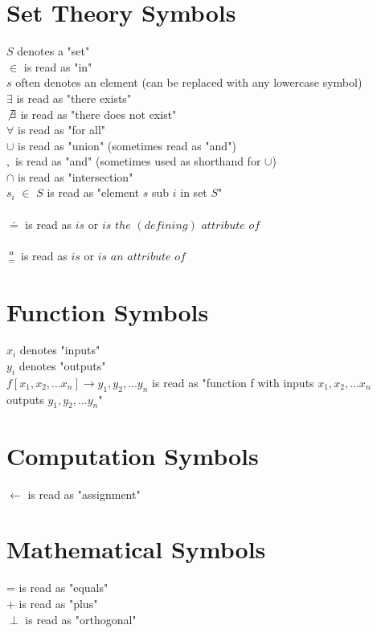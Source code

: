 \documentclass[11pt]{article}
\begin{document}
\section*{Set Theory Symbols}
$S$ denotes a "set"\\
$\in$ is read as "in"\\
$s$ often denotes an element (can be replaced with any lowercase symbol)\\
$\exists$ is read as "there exists"\\
$\not \exists$ is read as "there does not exist"\\
$\forall$ is read as "for all"\\
$\cup$ is read as "union" (sometimes read as "and")\\
$,$ \hspace{.5mm} is read as "and" (sometimes used as shorthand for $\cup$)\\
$\cap$ is read as "intersection"\\
$s_i$ $\in$ $S$ is read as "element $s$ sub $i$ in set $S$"\\ \\
$\doteq$ is read as $is$ or $is$ $the$ $(defining)$ $attribute$ $of$\\ \\
$a \atop=$ is read as $is$ or $is$ $an$ $attribute$ $of$\\








\section*{Function Symbols}
$x_i$ denotes "inputs"\\
$y_i$ denotes "outputs"\\
$f[x_1,x_2,...x_n] \rightarrow y_1, y_2,...y_n$ \hspace{1.5mm} is read as "function f with inputs $x_1,x_2,...x_n$ outputs $y_1,y_2,...y_n$"\\








\section*{Computation Symbols}
$\leftarrow$ is read as "assignment"\\








\section*{Mathematical Symbols}
= is read as "equals"\\
+ is read as "plus"\\
$\perp$ is read as "orthogonal"\\
\end{document}
